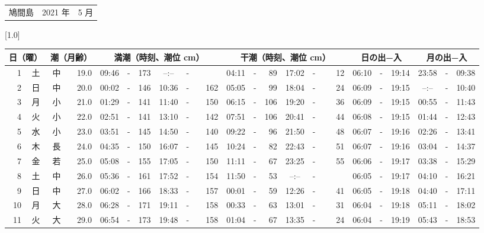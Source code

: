\documentclass[12pt,a4j]{jsarticle}
\begin{document}
 \begin{table}[htbp]
 \begin{center}
 \begin{tabular}{lcc}
 \LARGE{鳩間島}  & \large{2021 年} & \large{ 5 月} \\
 \end{tabular}
 \end{center}
 \begin{center}
    \scalebox{0.7}[1.0]{
    \begin{tabular}{|rc|cr|ccrccr|ccrccr|ccc|ccc|}
    \hline
    \multicolumn{2}{|c|}{日（曜）} & \multicolumn{2}{c|}{潮（月齢）} & \multicolumn{6}{c|}{満潮（時刻、潮位 cm）} & \multicolumn{6}{c|}{干潮（時刻、潮位 cm）} & \multicolumn{3}{c|}{日の出−入} &  \multicolumn{3}{c|}{月の出−入}\\
 \hline
 1 & 土 & 中 & 19.0 &  09:46 &-& 173 &  --:-- &-&~~~~~ &  04:11 &-&  89 &  17:02 &-&  12 & 06:10 & -& 19:14 & 23:58 & -& 09:38 \\
 2 & 日 & 中 & 20.0 &  00:02 &-& 146 &  10:36 &-& 162 &  05:05 &-&  99 &  18:04 &-&  24 & 06:09 & -& 19:15 & --:-- & -& 10:40 \\
 3 & 月 & 小 & 21.0 &  01:29 &-& 141 &  11:40 &-& 150 &  06:15 &-& 106 &  19:20 &-&  36 & 06:09 & -& 19:15 & 00:55 & -& 11:43 \\
 4 & 火 & 小 & 22.0 &  02:51 &-& 141 &  13:10 &-& 142 &  07:51 &-& 106 &  20:41 &-&  44 & 06:08 & -& 19:15 & 01:44 & -& 12:43 \\
 5 & 水 & 小 & 23.0 &  03:51 &-& 145 &  14:50 &-& 140 &  09:22 &-&  96 &  21:50 &-&  48 & 06:07 & -& 19:16 & 02:26 & -& 13:41 \\
 6 & 木 & 長 & 24.0 &  04:35 &-& 150 &  16:07 &-& 145 &  10:24 &-&  82 &  22:43 &-&  51 & 06:07 & -& 19:16 & 03:04 & -& 14:37 \\
 7 & 金 & 若 & 25.0 &  05:08 &-& 155 &  17:05 &-& 150 &  11:11 &-&  67 &  23:25 &-&  55 & 06:06 & -& 19:17 & 03:38 & -& 15:29 \\
 8 & 土 & 中 & 26.0 &  05:36 &-& 161 &  17:52 &-& 154 &  11:50 &-&  53 &  --:-- &-&~~~~~ & 06:05 & -& 19:17 & 04:10 & -& 16:21 \\
 9 & 日 & 中 & 27.0 &  06:02 &-& 166 &  18:33 &-& 157 &  00:01 &-&  59 &  12:26 &-&  41 & 06:05 & -& 19:18 & 04:40 & -& 17:11 \\
10 & 月 & 大 & 28.0 &  06:28 &-& 171 &  19:11 &-& 158 &  00:33 &-&  63 &  13:01 &-&  31 & 06:04 & -& 19:18 & 05:11 & -& 18:02 \\
11 & 火 & 大 & 29.0 &  06:54 &-& 173 &  19:48 &-& 158 &  01:04 &-&  67 &  13:35 &-&  24 & 06:04 & -& 19:19 & 05:43 & -& 18:53 \\

\end{tabular}}
\end{center}
\end{table}
\end{document}
